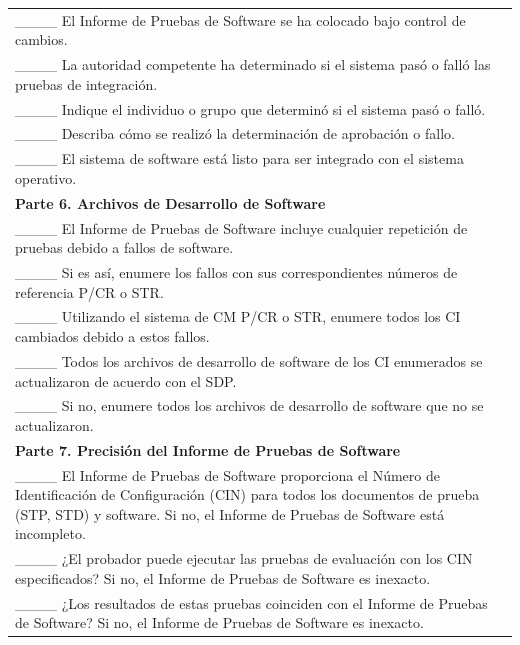 \begin{table}[H]
\begin{tabular}{|p{14cm}|}
\_\_\_\_ El Informe de Pruebas de Software se ha colocado bajo control de cambios. \\
\_\_\_\_ La autoridad competente ha determinado si el sistema pasó o falló las pruebas de integración. \\
\_\_\_\_ Indique el individuo o grupo que determinó si el sistema pasó o falló. \\
\_\_\_\_ Describa cómo se realizó la determinación de aprobación o fallo. \\
\_\_\_\_ El sistema de software está listo para ser integrado con el sistema operativo. \\
\textbf{Parte 6. Archivos de Desarrollo de Software} \\
\_\_\_\_ El Informe de Pruebas de Software incluye cualquier repetición de pruebas debido a fallos de software. \\
\_\_\_\_ Si es así, enumere los fallos con sus correspondientes números de referencia P/CR o STR. \\
\_\_\_\_ Utilizando el sistema de CM P/CR o STR, enumere todos los CI cambiados debido a estos fallos. \\
\_\_\_\_ Todos los archivos de desarrollo de software de los CI enumerados se actualizaron de acuerdo con el SDP. \\
\_\_\_\_ Si no, enumere todos los archivos de desarrollo de software que no se actualizaron. \\
\textbf{Parte 7. Precisión del Informe de Pruebas de Software} \\
\_\_\_\_ El Informe de Pruebas de Software proporciona el Número de Identificación de Configuración (CIN) para todos los documentos de prueba (STP, STD) y software. Si no, el Informe de Pruebas de Software está incompleto. \\
\_\_\_\_ ¿El probador puede ejecutar las pruebas de evaluación con los CIN especificados? Si no, el Informe de Pruebas de Software es inexacto. \\
\_\_\_\_ ¿Los resultados de estas pruebas coinciden con el Informe de Pruebas de Software? Si no, el Informe de Pruebas de Software es inexacto. \\
\hline
\end{tabular}
\end{table}

